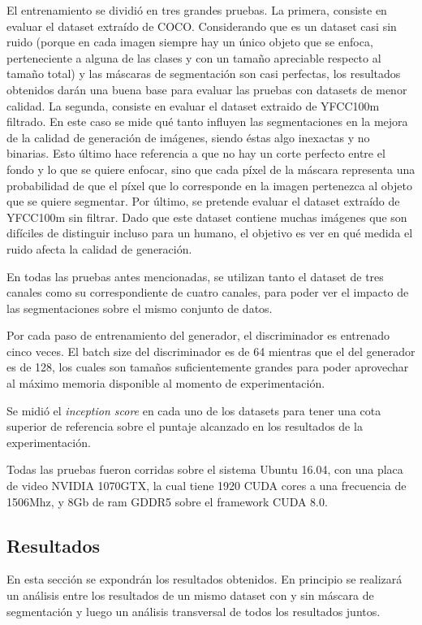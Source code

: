 \documentclass[spanish]{report}
\begin{document}
El entrenamiento se dividió en tres grandes pruebas. La primera, consiste en evaluar el dataset extraído de COCO. Considerando que es un dataset casi sin ruido (porque en cada imagen siempre hay un único objeto que se enfoca, perteneciente a alguna de las clases y con un tamaño apreciable respecto al tamaño total) y las máscaras de segmentación son casi perfectas, los resultados obtenidos darán una buena base para evaluar las pruebas con datasets de menor calidad. La segunda, consiste en evaluar el dataset extraido de YFCC100m filtrado. En este caso se mide qué tanto influyen las segmentaciones en la mejora de la calidad de generación de imágenes, siendo éstas algo inexactas y no binarias. Esto último hace referencia a que no hay un corte perfecto entre el fondo y lo que se quiere enfocar, sino que cada píxel de la máscara representa una probabilidad de que el píxel que lo corresponde en la imagen pertenezca al objeto que se quiere segmentar. Por último, se pretende evaluar el dataset extraído de YFCC100m sin filtrar. Dado que este dataset contiene muchas imágenes que son difíciles de distinguir incluso para un humano, el objetivo es ver en qué medida el ruido afecta la calidad de generación.

En todas las pruebas antes mencionadas, se utilizan tanto el dataset de tres canales como su correspondiente de cuatro canales, para poder ver el impacto de las segmentaciones sobre el mismo conjunto de datos.

Por cada paso de entrenamiento del generador, el discriminador es entrenado cinco veces. El batch size del discriminador es de 64 mientras que el del generador es de 128, los cuales son tamaños suficientemente grandes para poder aprovechar al máximo memoria disponible al momento de experimentación.

Se midió el \textit{inception score} en cada uno de los datasets para tener una cota superior de referencia sobre el puntaje alcanzado en los resultados de la experimentación.

Todas las pruebas fueron corridas sobre el sistema Ubuntu 16.04, con una placa de video NVIDIA 1070GTX, la cual tiene 1920 CUDA cores a una frecuencia de 1506Mhz, y 8Gb de ram GDDR5 sobre el framework CUDA 8.0.

\subsection{Resultados}
\enlargethispage{0.5in}
En esta sección se expondrán los resultados obtenidos. En principio se realizará un análisis entre los resultados de un mismo dataset con y sin máscara de segmentación y luego un análisis transversal de todos los resultados juntos.
\end{document}
